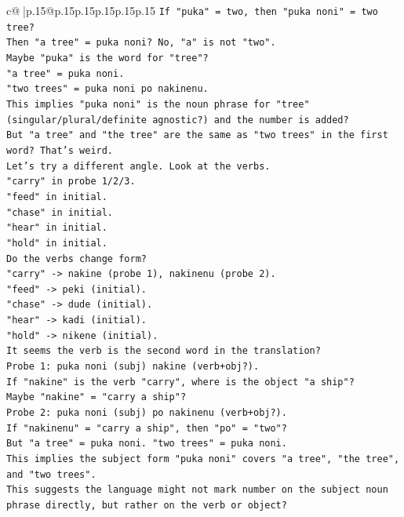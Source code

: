 \documentclass{article}
\begin{document}
{\begin{supertabular}{c@{$\;$}|p{.15\linewidth}@{}p{.15\linewidth}p{.15\linewidth}p{.15\linewidth}p{.15\linewidth}p{.15\linewidth}}
{{{\texttt{If "puka" = two, then "puka noni" = two tree?} \\
\texttt{Then "a tree" = puka noni? No, "a" is not "two".} \\
\texttt{Maybe "puka" is the word for "tree"?} \\
\texttt{"a tree" = puka noni.} \\
\texttt{"two trees" = puka noni po nakinenu.} \\
\texttt{This implies "puka noni" is the noun phrase for "tree" (singular/plural/definite agnostic?) and the number is added?} \\
\texttt{But "a tree" and "the tree" are the same as "two trees" in the first word? That's weird.} \\
\texttt{Let's try a different angle. Look at the verbs.} \\
\texttt{"carry" in probe 1/2/3.} \\
\texttt{"feed" in initial.} \\
\texttt{"chase" in initial.} \\
\texttt{"hear" in initial.} \\
\texttt{"hold" in initial.} \\
\texttt{Do the verbs change form?} \\
\texttt{"carry" {-}> nakine (probe 1), nakinenu (probe 2).} \\
\texttt{"feed" {-}> peki (initial).} \\
\texttt{"chase" {-}> dude (initial).} \\
\texttt{"hear" {-}> kadi (initial).} \\
\texttt{"hold" {-}> nikene (initial).} \\
\texttt{It seems the verb is the second word in the translation?} \\
\texttt{Probe 1: puka noni (subj) nakine (verb+obj?).} \\
\texttt{If "nakine" is the verb "carry", where is the object "a ship"?} \\
\texttt{Maybe "nakine" = "carry a ship"?} \\
\texttt{Probe 2: puka noni (subj) po nakinenu (verb+obj?).} \\
\texttt{If "nakinenu" = "carry a ship", then "po" = "two"?} \\
\texttt{But "a tree" = puka noni. "two trees" = puka noni.} \\
\texttt{This implies the subject form "puka noni" covers "a tree", "the tree", and "two trees".} \\
\texttt{This suggests the language might not mark number on the subject noun phrase directly, but rather on the verb or object?} \\
}}}
\end{supertabular}}
\end{document}
